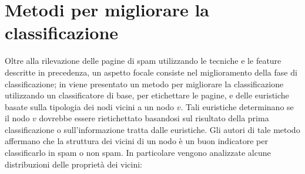 \section{Metodi per migliorare la classificazione}
Oltre alla rilevazione delle pagine di spam utilizzando le tecniche e le feature descritte in precedenza, un aspetto focale consiste nel miglioramento della fase di classificazione; in \cite{Gan:2007:IWS:1244408.1244412} viene presentato un metodo per migliorare la classificazione  utilizzando un classificatore di base, per etichettare le pagine, e delle euristiche basate sulla tipologia dei nodi vicini a un nodo \(v\). Tali euristiche determinano se il nodo \(v\) dovrebbe essere rietichettato basandosi sul risultato della prima classificazione o sull'informazione tratta dalle euristiche. Gli autori di tale metodo affermano che  la struttura dei vicini di un nodo è un buon indicatore  per classificarlo in  spam o non spam. In particolare vengono analizzate alcune distribuzioni delle proprietà dei vicini:
